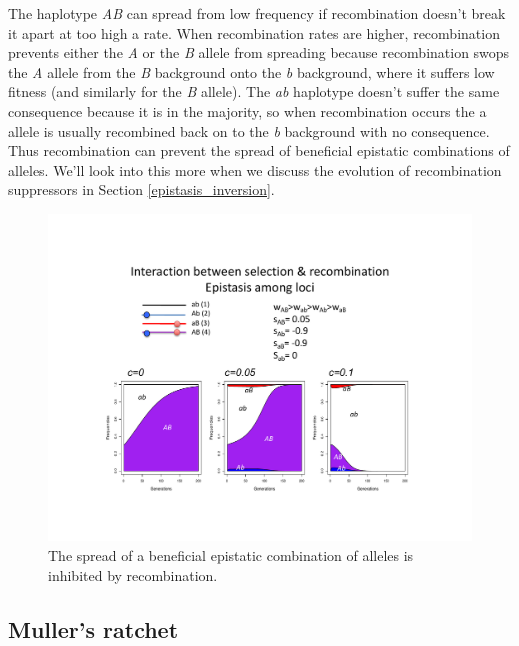 The haplotype {\it AB} can spread from low frequency if recombination doesn't break it apart at too high a rate. When recombination rates are higher, recombination prevents either the {\it A} or the {\it B} allele from spreading because recombination swops the {\it A} allele from the {\it B} background onto the {\it b} background, where it suffers low fitness (and similarly for the {\it B} allele). The {\it ab} haplotype doesn't suffer the same consequence because it is in the majority, so when recombination occurs the a allele is usually recombined back on to the {\it b} background with no consequence. Thus recombination can prevent the spread of beneficial epistatic combinations of alleles. We'll look into this more when we discuss the evolution of recombination suppressors in Section \ref{epistasis_inversion}.
\begin{figure}
\begin{center}
  \includegraphics[width = \textwidth]{figures/selection_recom_interaction/Epistasis_vs_recom.pdf}
\end{center}
\caption{The spread of a beneficial epistatic combination of alleles is inhibited by recombination. } \label{fig Epistasis_vs_recom}  
\end{figure}
\subsection{Muller's ratchet}

